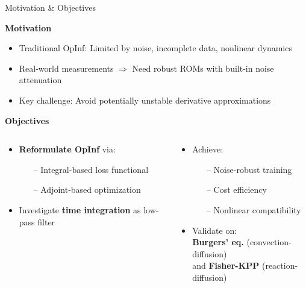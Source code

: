 \begin{frame}{Motivation \& Objectives}

\textbf{Motivation}
\begin{itemize}
    \item Traditional OpInf: Limited by noise, incomplete data, nonlinear dynamics
    \item Real-world measurements $\Rightarrow$ Need robust ROMs with built-in noise attenuation
    \item Key challenge: Avoid potentially unstable derivative approximations
\end{itemize}

\vspace{0.3cm}

\textbf{Objectives}
\begin{columns}[T]
\begin{column}{0.48\textwidth}
\begin{itemize}
    \item \textbf{Reformulate OpInf} via:
    \begin{itemize}
        \item[--] Integral-based loss functional
        \item[--] Adjoint-based optimization
    \end{itemize}
    \item Investigate \textbf{time integration} as low-pass filter
\end{itemize}
\end{column}
\hspace{-1.5cm}
\begin{column}{0.48\textwidth}
\begin{itemize}
    \item Achieve:
    \begin{itemize}
        \item[--] Noise-robust training
        \item[--] Cost efficiency
        \item[--] Nonlinear compatibility
    \end{itemize}
    \item Validate on:\\ \textbf{Burgers' eq.} (convection-diffusion)\\and \textbf{Fisher-KPP} (reaction-diffusion)
\end{itemize}
\end{column}
\end{columns}

\end{frame}

